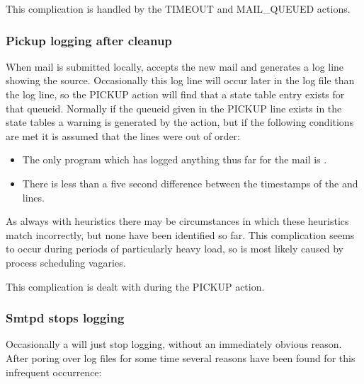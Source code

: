 This complication is handled by the TIMEOUT and MAIL\_QUEUED actions.

\subsubsection{Pickup logging after cleanup}

\label{pickup logging after cleanup}

When mail is submitted locally,  accepts the new mail and
generates a log line showing the source.  Occasionally this log line will
occur later in the log file than the  log line, so the
PICKUP action will find that a state table entry exists for that queueid.
Normally if the queueid given in the PICKUP line exists in the state tables
a warning is generated by the  action, but if the following
conditions are met it is assumed that the lines were out of order:

\begin{itemize}

    \item The only program which has logged anything thus far for the mail
        is .

    \item There is less than a five second difference between the
        timestamps of the  and  lines.

\end{itemize}

As always with heuristics there may be circumstances in which these
heuristics match incorrectly, but none have been identified so far.  This
complication seems to occur during periods of particularly heavy load, so
is most likely caused by process scheduling vagaries.  

This complication is dealt with during the PICKUP action.

\subsubsection{Smtpd stops logging}

\label{smtpd stops logging}

Occasionally a  will just stop logging, without an
immediately obvious reason.  After poring over log files for some time
several reasons have been found for this infrequent occurrence:


